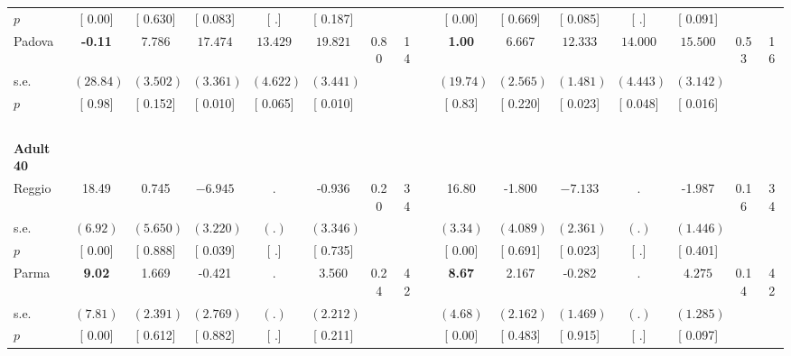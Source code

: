 \begin{longtable}{L{8em} c c c c c c c p{1em} c c c c c c c}
\quad \quad \quad \quad $ p$ & [     0.00] & [    0.630] & [    0.083] & [        .] & [    0.187] & & & & [     0.00] & [    0.669] & [    0.085] & [        .] & [    0.091] & &  \\[1em]
\quad \quad \quad Padova& \textbf{    -0.11} &     7.786 & $ \mathbf{   17.474}$ & $ \mathbf{   13.429}$ & $ \mathbf{   19.821}$ &      0.80 &        14 & & \textbf{     1.00} &     6.667 & $ \mathbf{   12.333}$ & $ \mathbf{   14.000}$ & $ \mathbf{   15.500}$ &      0.53 &        16  \\*
\quad \quad \quad \quad s.e.& $ (    28.84)$ & $ (    3.502)$ & $ (    3.361)$ & $ (    4.622)$ & $ (    3.441)$ & & & & $ (    19.74)$ & $ (    2.565)$ & $ (    1.481)$ & $ (    4.443)$ & $ (    3.142)$ & &  \\*
\quad \quad \quad \quad $ p$ & [     0.98] & [    0.152] & [    0.010] & [    0.065] & [    0.010] & & & & [     0.83] & [    0.220] & [    0.023] & [    0.048] & [    0.016] & &  \\[1em]
~\\[1em]
\quad \quad \textbf{Adult 40} & & & & & & & & & & & & & & & \\* 
\quad \quad \quad Reggio& 18.49 &     0.745 & $ \mathbf{   -6.945}$ &         . &    -0.936 &      0.20 &        34 & & 16.80 &    -1.800 & $ \mathbf{   -7.133}$ &         . &    -1.987 &      0.16 &        34  \\*
\quad \quad \quad \quad s.e.& $ (     6.92)$ & $ (    5.650)$ & $ (    3.220)$ & $ (        .)$ & $ (    3.346)$ & & & & $ (     3.34)$ & $ (    4.089)$ & $ (    2.361)$ & $ (        .)$ & $ (    1.446)$ & &  \\*
\quad \quad \quad \quad $ p$ & [     0.00] & [    0.888] & [    0.039] & [        .] & [    0.735] & & & & [     0.00] & [    0.691] & [    0.023] & [        .] & [    0.401] & &  \\[1em]
\quad \quad \quad Parma& \textbf{     9.02} &     1.669 &    -0.421 &         . &     3.560 &      0.24 &        42 & & \textbf{     8.67} &     2.167 &    -0.282 &         . & $ \mathbf{    4.275}$ &      0.14 &        42  \\*
\quad \quad \quad \quad s.e.& $ (     7.81)$ & $ (    2.391)$ & $ (    2.769)$ & $ (        .)$ & $ (    2.212)$ & & & & $ (     4.68)$ & $ (    2.162)$ & $ (    1.469)$ & $ (        .)$ & $ (    1.285)$ & &  \\*
\quad \quad \quad \quad $ p$ & [     0.00] & [    0.612] & [    0.882] & [        .] & [    0.211] & & & & [     0.00] & [    0.483] & [    0.915] & [        .] & [    0.097] & &  \\[1em]

\end{longtable}

